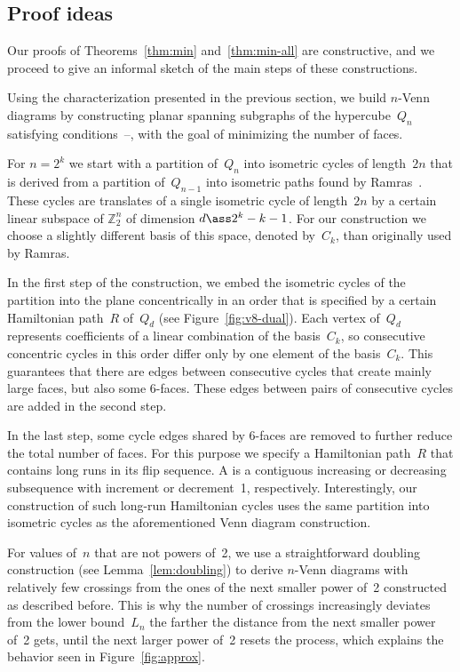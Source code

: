 \documentclass[a4paper,11pt,reqno]{amsart}
\begin{document}
\subsection{Proof ideas}
\label{sec:ideas}

Our proofs of Theorems~\ref{thm:min} and~\ref{thm:min-all} are constructive, and we proceed to give an informal sketch of the main steps of these constructions.

Using the characterization presented in the previous section, we build $n$-Venn diagrams by constructing planar spanning subgraphs of the hypercube~$Q_n$ satisfying conditions~--, with the goal of minimizing the number of faces.

For $n=2^k$ we start with a partition of~$Q_n$ into isometric cycles of length~$2n$ that is derived from a partition of~$Q_{n-1}$ into isometric paths found by Ramras~\cite{MR1152451}.
These cycles are translates of a single isometric cycle of length~$2n$ by a certain linear subspace of $\mathbb{Z}_2^n$ of dimension $d\ass 2^k-k-1$.
For our construction we choose a slightly different basis of this space, denoted by~$C_k$, than originally used by Ramras.

In the first step of the construction, we embed the isometric cycles of the partition into the plane concentrically in an order that is specified by a  certain Hamiltonian path~$R$ of~$Q_d$ (see Figure~\ref{fig:v8-dual}).
Each vertex of~$Q_d$ represents coefficients of a linear combination of the basis~$C_k$, so consecutive concentric cycles in this order differ only by one element of the basis~$C_k$.
This guarantees that there are edges between consecutive cycles that create mainly large faces, but also some 6-faces.
These edges between pairs of consecutive cycles are added in the second step.

In the last step, some cycle edges shared by 6-faces are removed to further reduce the total number of faces.
For this purpose we specify a Hamiltonian path~$R$ that contains long runs in its flip sequence.
A  is a contiguous increasing or decreasing subsequence with increment or decrement~1, respectively.
Interestingly, our construction of such long-run Hamiltonian cycles uses the same partition into isometric cycles as the aforementioned Venn diagram construction.

For values of~$n$ that are not powers of~2, we use a straightforward doubling construction (see Lemma~\ref{lem:doubling}) to derive $n$-Venn diagrams with relatively few crossings from the ones of the next smaller power of~2 constructed as described before.
This is why the number of crossings increasingly deviates from the lower bound~$L_n$ the farther the distance from the next smaller power of~2 gets, until the next larger power of~2 resets the process, which explains the behavior seen in Figure~\ref{fig:approx}.
\end{document}
